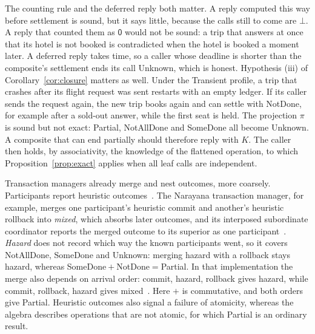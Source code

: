 \documentclass[11pt]{article}
\theoremstyle{definition}
\theoremstyle{plain}
\newcommand{\NotDone}{\textsf{NotDone}}
\newcommand{\Unknown}{\textsf{Unknown}}
\newcommand{\no}{\mathsf{0}}
\newcommand{\mayb}{\bot}
\begin{document}
The counting rule and the deferred reply both matter. A reply computed this way before settlement is sound, but it says little, because the calls still to come are $\mayb$. A reply that counted them as $\no$ would not be sound: a trip that answers at once that its hotel is not booked is contradicted when the hotel is booked a moment later. A deferred reply takes time, so a caller whose deadline is shorter than the composite's settlement ends its call \Unknown, which is honest. Hypothesis (iii) of Corollary~\ref{cor:closure} matters as well. Under the Transient profile, a trip that crashes after its flight request was sent restarts with an empty ledger. If its caller sends the request again, the new trip books again and can settle with \NotDone, for example after a sold-out answer, while the first seat is held. The projection $\pi$ is sound but not exact: \textsf{Partial}, \textsf{NotAllDone} and \textsf{SomeDone} all become \Unknown. A composite that can end partially should therefore reply with $K$. The caller then holds, by associativity, the knowledge of the flattened operation, to which Proposition~\ref{prop:exact} applies when all leaf calls are independent.

Transaction managers already merge and nest outcomes, more coarsely. Participants report heuristic outcomes~\citep{XA1991}. The Narayana transaction manager, for example, merges one participant's heuristic commit and another's heuristic rollback into \emph{mixed}, which absorbs later outcomes, and its interposed subordinate coordinator reports the merged outcome to its superior as one participant~\citep{Narayana}. \emph{Hazard} does not record which way the known participants went, so it covers \textsf{NotAllDone}, \textsf{SomeDone} and \Unknown: merging hazard with a rollback stays hazard, whereas \textsf{SomeDone}${}+{}$\NotDone${}={}$\textsf{Partial}. In that implementation the merge also depends on arrival order: commit, hazard, rollback gives hazard, while commit, rollback, hazard gives mixed~\citep{Narayana}. Here $+$ is commutative, and both orders give \textsf{Partial}. Heuristic outcomes also signal a failure of atomicity, whereas the algebra describes operations that are not atomic, for which \textsf{Partial} is an ordinary result.
\end{document}
